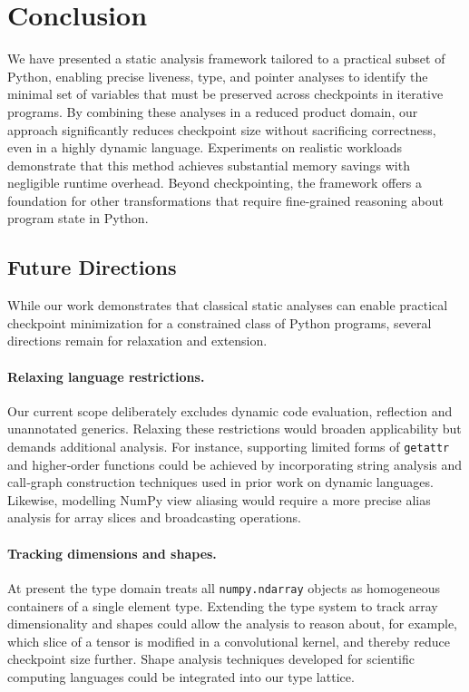 
\section{Conclusion}
\label{sec:conclusion}

We have presented a static analysis framework tailored to a practical subset of Python, enabling precise liveness, type, and pointer analyses to identify the minimal set of variables that must be preserved across checkpoints in iterative programs. By combining these analyses in a reduced product domain, our approach significantly reduces checkpoint size without sacrificing correctness, even in a highly dynamic language. Experiments on realistic workloads demonstrate that this method achieves substantial memory savings with negligible runtime overhead. Beyond checkpointing, the framework offers a foundation for other transformations that require fine-grained reasoning about program state in Python.

\subsection{Future Directions}

While our work demonstrates that classical static analyses can enable practical checkpoint minimization for a constrained class of Python programs, several directions remain for relaxation and extension.

\paragraph{Relaxing language restrictions.} Our current scope deliberately excludes dynamic code evaluation, reflection and unannotated generics. Relaxing these restrictions would broaden applicability but demands additional analysis. For instance, supporting limited forms of \texttt{getattr} and higher‑order functions could be achieved by incorporating string analysis and call‑graph construction techniques used in prior work on dynamic languages. Likewise, modelling NumPy view aliasing would require a more precise alias analysis for array slices and broadcasting operations.

\paragraph{Tracking dimensions and shapes.} At present the type domain treats all \texttt{numpy.ndarray} objects as homogeneous containers of a single element type. Extending the type system to track array dimensionality and shapes could allow the analysis to reason about, for example, which slice of a tensor is modified in a convolutional kernel, and thereby reduce checkpoint size further. Shape analysis techniques developed for scientific computing languages could be integrated into our type lattice.

